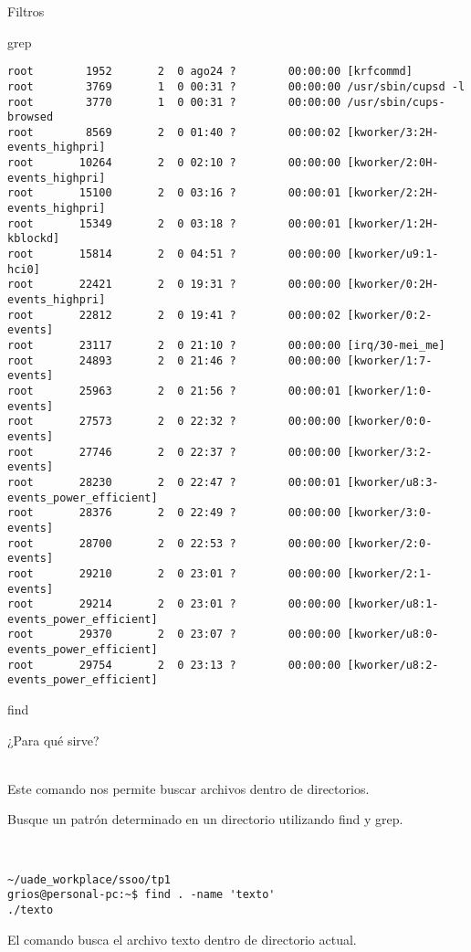 \begin{section}{Filtros}
\begin{subsection}{grep}
\begin{lstlisting}[style=Ubuntu]
root        1952       2  0 ago24 ?        00:00:00 [krfcommd]
root        3769       1  0 00:31 ?        00:00:00 /usr/sbin/cupsd -l
root        3770       1  0 00:31 ?        00:00:00 /usr/sbin/cups-browsed
root        8569       2  0 01:40 ?        00:00:02 [kworker/3:2H-events_highpri]
root       10264       2  0 02:10 ?        00:00:00 [kworker/2:0H-events_highpri]
root       15100       2  0 03:16 ?        00:00:01 [kworker/2:2H-events_highpri]
root       15349       2  0 03:18 ?        00:00:01 [kworker/1:2H-kblockd]
root       15814       2  0 04:51 ?        00:00:00 [kworker/u9:1-hci0]
root       22421       2  0 19:31 ?        00:00:00 [kworker/0:2H-events_highpri]
root       22812       2  0 19:41 ?        00:00:02 [kworker/0:2-events]
root       23117       2  0 21:10 ?        00:00:00 [irq/30-mei_me]
root       24893       2  0 21:46 ?        00:00:00 [kworker/1:7-events]
root       25963       2  0 21:56 ?        00:00:01 [kworker/1:0-events]
root       27573       2  0 22:32 ?        00:00:00 [kworker/0:0-events]
root       27746       2  0 22:37 ?        00:00:00 [kworker/3:2-events]
root       28230       2  0 22:47 ?        00:00:01 [kworker/u8:3-events_power_efficient]
root       28376       2  0 22:49 ?        00:00:00 [kworker/3:0-events]
root       28700       2  0 22:53 ?        00:00:00 [kworker/2:0-events]
root       29210       2  0 23:01 ?        00:00:00 [kworker/2:1-events]
root       29214       2  0 23:01 ?        00:00:00 [kworker/u8:1-events_power_efficient]
root       29370       2  0 23:07 ?        00:00:00 [kworker/u8:0-events_power_efficient]
root       29754       2  0 23:13 ?        00:00:00 [kworker/u8:2-events_power_efficient]

\end{lstlisting}

\end{subsection}

\begin{subsection}{find}
\begin{quoting}
¿Para qué sirve?
\end{quoting}\\
Este comando nos permite buscar archivos dentro de directorios.

\begin{quoting}
Busque un patrón determinado en un directorio utilizando find y grep.
\end{quoting}\\

\begin{lstlisting}[style=Ubuntu]
~/uade_workplace/ssoo/tp1
grios@personal-pc:~$ find . -name 'texto'
./texto

\end{lstlisting}
El comando busca el archivo texto dentro de directorio actual.

\end{subsection}

\end{section}